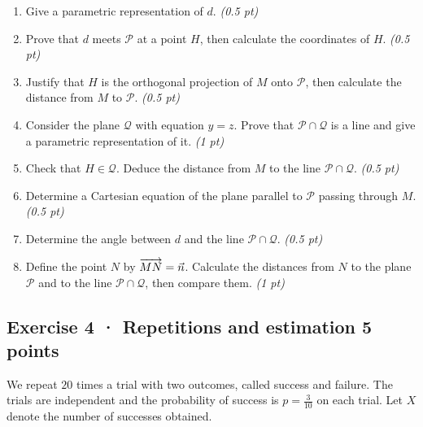 \begin{enumerate}

\item Give a parametric representation of $d$. \hfill\textit{(0.5 pt)}

\item Prove that $d$ meets $\mathcal P$ at a point $H$, then calculate the coordinates of $H$. \hfill\textit{(0.5 pt)}

\item Justify that $H$ is the orthogonal projection of $M$ onto $\mathcal P$, then calculate the distance from $M$ to $\mathcal P$. \hfill\textit{(0.5 pt)}

\item Consider the plane $\mathcal Q$ with equation $y=z$. Prove that $\mathcal P\cap\mathcal Q$ is a line and give a parametric representation of it. \hfill\textit{(1 pt)}

\item Check that $H\in\mathcal Q$. Deduce the distance from $M$ to the line $\mathcal P\cap\mathcal Q$. \hfill\textit{(0.5 pt)}

\item Determine a Cartesian equation of the plane parallel to $\mathcal P$ passing through $M$. \hfill\textit{(0.5 pt)}

\item Determine the angle between $d$ and the line $\mathcal P\cap\mathcal Q$. \hfill\textit{(0.5 pt)}

\item Define the point $N$ by $\overrightarrow{MN}=\vec n$. Calculate the distances from $N$ to the plane $\mathcal P$ and to the line $\mathcal P\cap\mathcal Q$, then compare them. \hfill\textit{(1 pt)}

\end{enumerate}

\subsection*{Exercise 4 · Repetitions and estimation \hfill 5 points}We repeat $20$ times a trial with two outcomes, called success and failure. The trials are independent and the probability of success is $p=\frac{3}{10}$ on each trial. Let $X$ denote the number of successes obtained.

